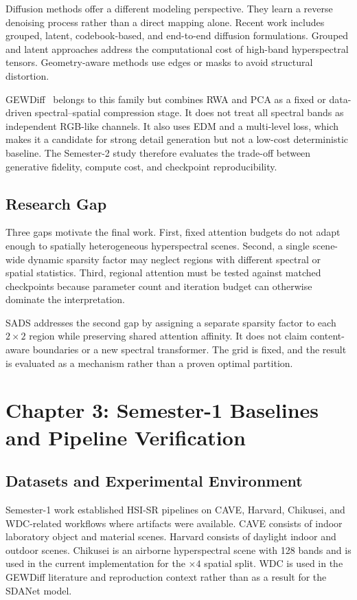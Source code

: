 \documentclass[10pt,twocolumn,letterpaper]{article}
\begin{document}
Diffusion methods offer a different modeling perspective. They learn a reverse denoising process rather than a direct mapping alone. Recent work includes grouped, latent, codebook-based, and end-to-end diffusion formulations. Grouped and latent approaches address the computational cost of high-band hyperspectral tensors. Geometry-aware methods use edges or masks to avoid structural distortion.

GEWDiff~\cite{wang2026gew} belongs to this family but combines RWA and PCA as a fixed or data-driven spectral--spatial compression stage. It does not treat all spectral bands as independent RGB-like channels. It also uses EDM and a multi-level loss, which makes it a candidate for strong detail generation but not a low-cost deterministic baseline. The Semester-2 study therefore evaluates the trade-off between generative fidelity, compute cost, and checkpoint reproducibility.

\subsection{Research Gap}

Three gaps motivate the final work. First, fixed attention budgets do not adapt enough to spatially heterogeneous hyperspectral scenes. Second, a single scene-wide dynamic sparsity factor may neglect regions with different spectral or spatial statistics. Third, regional attention must be tested against matched checkpoints because parameter count and iteration budget can otherwise dominate the interpretation.

SADS addresses the second gap by assigning a separate sparsity factor to each $2\times2$ region while preserving shared attention affinity. It does not claim content-aware boundaries or a new spectral transformer. The grid is fixed, and the result is evaluated as a mechanism rather than a proven optimal partition.

\section{Chapter 3: Semester-1 Baselines and Pipeline Verification}
\label{sec:semester-one}

\subsection{Datasets and Experimental Environment}

Semester-1 work established HSI-SR pipelines on CAVE, Harvard, Chikusei, and WDC-related workflows where artifacts were available. CAVE consists of indoor laboratory object and material scenes. Harvard consists of daylight indoor and outdoor scenes. Chikusei is an airborne hyperspectral scene with 128 bands and is used in the current implementation for the $\times4$ spatial split. WDC is used in the GEWDiff literature and reproduction context rather than as a result for the SDANet model.
\end{document}
